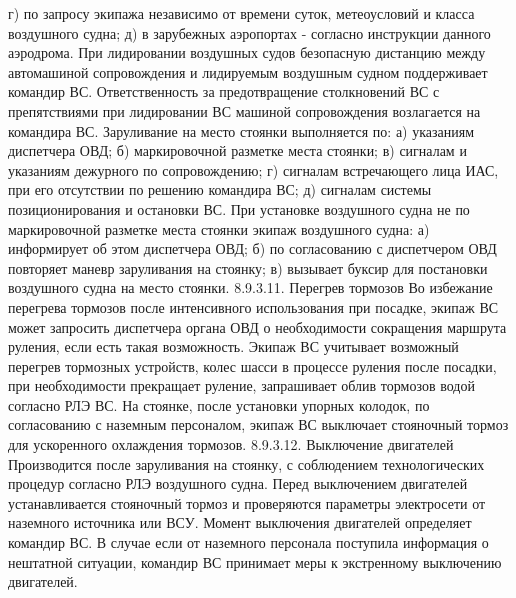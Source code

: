 г)	по запросу экипажа независимо от времени суток, метеоусловий и класса воздушного судна; 
д)	в зарубежных аэропортах - согласно инструкции данного аэродрома. 
При лидировании воздушных судов безопасную дистанцию между автомашиной сопровождения и лидируемым воздушным судном поддерживает командир ВС. 
Ответственность за предотвращение столкновений ВС с препятствиями при лидировании ВС машиной сопровождения возлагается на командира ВС. 
Заруливание на место стоянки выполняется по:
а)	указаниям диспетчера ОВД;
б)	маркировочной разметке места стоянки;
в)	сигналам и указаниям дежурного по сопровождению;
г)	сигналам встречающего лица ИАС, при его отсутствии по решению командира ВС;
д)	сигналам системы позиционирования и остановки ВС.
При установке воздушного судна не по маркировочной разметке места стоянки экипаж воздушного судна:
а)	информирует об этом диспетчера ОВД;
б)	по согласованию с диспетчером ОВД повторяет маневр заруливания на стоянку;
в)	вызывает буксир для постановки воздушного судна на место стоянки.
8.9.3.11.	Перегрев тормозов
Во избежание перегрева тормозов после интенсивного использования при посадке, экипаж ВС может запросить диспетчера органа ОВД о необходимости сокращения маршрута руления, если есть такая возможность. Экипаж ВС учитывает возможный перегрев тормозных устройств, колес шасси в процессе руления после посадки, при необходимости прекращает руление, запрашивает облив тормозов водой согласно РЛЭ ВС. 
На стоянке, после установки упорных колодок, по согласованию с наземным персоналом, экипаж ВС выключает стояночный тормоз для ускоренного охлаждения тормозов.
8.9.3.12.	Выключение двигателей
Производится после заруливания на стоянку, с соблюдением технологических процедур согласно РЛЭ воздушного судна. 
Перед выключением двигателей устанавливается стояночный тормоз и проверяются параметры электросети от наземного источника или ВСУ. Момент выключения двигателей определяет командир ВС. 
В случае если от наземного персонала поступила информация о нештатной ситуации, командир ВС принимает меры к экстренному выключению двигателей. 

